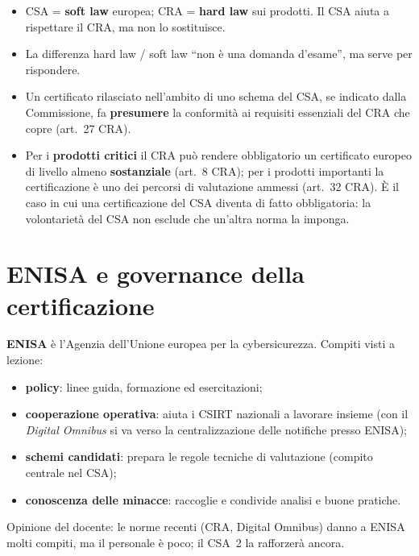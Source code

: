 \begin{esame}
\begin{itemize}
  \item CSA = \textbf{soft law} europea; CRA = \textbf{hard law} sui prodotti. Il CSA aiuta a rispettare il
    CRA, ma non lo sostituisce.
  \item La differenza hard law / soft law ``non è una domanda d'esame'', ma serve per rispondere.
\end{itemize}
\end{esame}

\begin{integrazione}
\begin{itemize}
  \item Un certificato rilasciato nell'ambito di uno schema del CSA, se indicato dalla Commissione, fa
    \textbf{presumere} la conformità ai requisiti essenziali del CRA che copre (art.~27 CRA).
  \item Per i \textbf{prodotti critici} il CRA può rendere obbligatorio un certificato europeo di livello
    almeno \textbf{sostanziale} (art.~8 CRA); per i prodotti importanti la certificazione è uno dei
    percorsi di valutazione ammessi (art.~32 CRA). È il caso in cui una certificazione del CSA diventa di
    fatto obbligatoria: la volontarietà del CSA non esclude che un'altra norma la imponga.
\end{itemize}
\end{integrazione}

\section{ENISA e governance della certificazione}
\label{sec:csa-enisa}

\textbf{ENISA} è l'Agenzia dell'Unione europea per la cybersicurezza. Compiti visti a lezione:
\begin{itemize}
  \item \textbf{policy}: linee guida, formazione ed esercitazioni;
  \item \textbf{cooperazione operativa}: aiuta i CSIRT nazionali a lavorare insieme (con il
    \emph{Digital Omnibus} si va verso la centralizzazione delle notifiche presso ENISA);
  \item \textbf{schemi candidati}: prepara le regole tecniche di valutazione (compito centrale nel CSA);
  \item \textbf{conoscenza delle minacce}: raccoglie e condivide analisi e buone pratiche.
\end{itemize}
Opinione del docente: le norme recenti (CRA, Digital Omnibus) danno a ENISA molti compiti, ma il
personale è poco; il CSA~2 la rafforzerà ancora.


